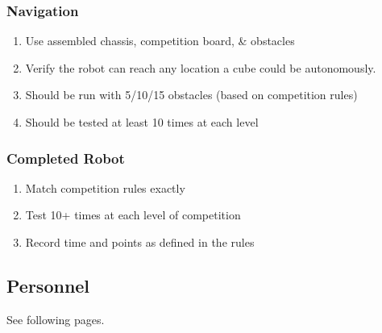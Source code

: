 \documentclass[12pt]{article}
\begin{document}
\subsubsection{Navigation}
	\begin{enumerate}[noitemsep]
		\item Use assembled chassis, competition board, \& obstacles
		\item Verify the robot can reach any location a cube could be autonomously.
		\item Should be run with 5/10/15 obstacles (based on competition rules)
		\item Should be tested at least 10 times at each level
	\end{enumerate}
\subsubsection{Completed Robot}
	\begin{enumerate}[noitemsep]
		\item Match competition rules exactly
		\item Test 10+ times at each level of competition
		\item Record time and points as defined in the rules
	\end{enumerate}

\subsection{Personnel}

See following pages.
\end{document}
